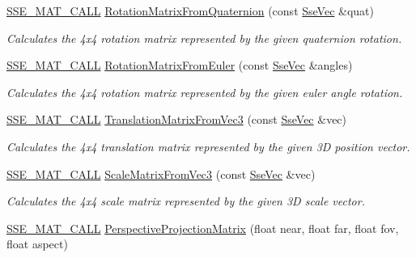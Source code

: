 \begin{DoxyCompactItemize}
\hyperlink{ssemat__math__defs_8h_a741f88d5589197d03fea9ab2b7622b8a}{S\+S\+E\+\_\+\+M\+A\+T\+\_\+\+C\+A\+L\+L} \hyperlink{namespacegfxmath_a786ee918eca59978387d6fce4dab5122}{Rotation\+Matrix\+From\+Quaternion} (const \hyperlink{namespacegfxmath_a0de2243e2b8d0fd46d3af5e036423004}{Sse\+Vec} \&quat)
\begin{DoxyCompactList}\small\item\em Calculates the 4x4 rotation matrix represented by the given quaternion rotation. \end{DoxyCompactList}\item 
\hyperlink{ssemat__math__defs_8h_a741f88d5589197d03fea9ab2b7622b8a}{S\+S\+E\+\_\+\+M\+A\+T\+\_\+\+C\+A\+L\+L} \hyperlink{namespacegfxmath_ac11c40e17108aa72d069b01b6a08bebf}{Rotation\+Matrix\+From\+Euler} (const \hyperlink{namespacegfxmath_a0de2243e2b8d0fd46d3af5e036423004}{Sse\+Vec} \&angles)
\begin{DoxyCompactList}\small\item\em Calculates the 4x4 rotation matrix represented by the given euler angle rotation. \end{DoxyCompactList}\item 
\hyperlink{ssemat__math__defs_8h_a741f88d5589197d03fea9ab2b7622b8a}{S\+S\+E\+\_\+\+M\+A\+T\+\_\+\+C\+A\+L\+L} \hyperlink{namespacegfxmath_a2b08e7c142f14df78883494d9c2f66e8}{Translation\+Matrix\+From\+Vec3} (const \hyperlink{namespacegfxmath_a0de2243e2b8d0fd46d3af5e036423004}{Sse\+Vec} \&vec)
\begin{DoxyCompactList}\small\item\em Calculates the 4x4 translation matrix represented by the given 3\+D position vector. \end{DoxyCompactList}\item 
\hyperlink{ssemat__math__defs_8h_a741f88d5589197d03fea9ab2b7622b8a}{S\+S\+E\+\_\+\+M\+A\+T\+\_\+\+C\+A\+L\+L} \hyperlink{namespacegfxmath_a7971ccb3a66b526ba72c66477539c923}{Scale\+Matrix\+From\+Vec3} (const \hyperlink{namespacegfxmath_a0de2243e2b8d0fd46d3af5e036423004}{Sse\+Vec} \&vec)
\begin{DoxyCompactList}\small\item\em Calculates the 4x4 scale matrix represented by the given 3\+D scale vector. \end{DoxyCompactList}\item 
\hyperlink{ssemat__math__defs_8h_a741f88d5589197d03fea9ab2b7622b8a}{S\+S\+E\+\_\+\+M\+A\+T\+\_\+\+C\+A\+L\+L} \hyperlink{namespacegfxmath_a701f5bfeb4c0c0d4b080a9ad00f910ce}{Perspective\+Projection\+Matrix} (float near, float far, float fov, float aspect)

\end{DoxyCompactItemize}
